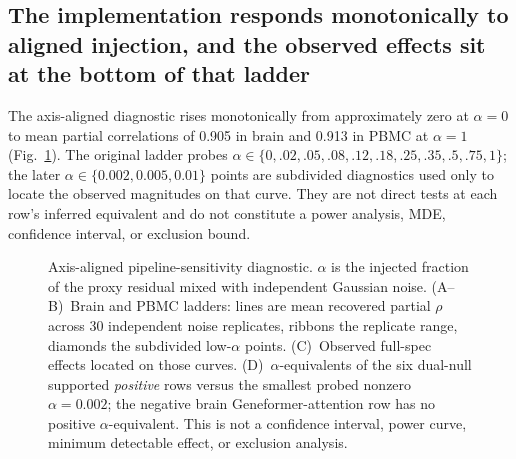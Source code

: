 \documentclass[fleqn,10pt,lineno]{wlpeerj}
\newcommand{\fitfig}[1]{\resizebox{\ifdim\width>\linewidth\linewidth\else\width\fi}{!}{#1}}
\begin{document}
\begin{table}[!tbp]\centering
\fitfig{}
\caption{Per-cell-type descriptive ranges of observed partial $\rho$ under full and non-degree
confound specifications (brain: 15 exploratory FM$\times$type rows; PBMC: 14). Min/max/median
across those rows only; no randomization $p$-values, BH correction, or population-uncertainty
interpretation.}\label{tab:pertype_ranges}
\end{table}

\begin{table}[!tbp]\centering
\fitfig{}
\caption{Non-degree dual-null pattern for all 13 FM rows. The co-primary non-degree specification
is the full design minus the two proxy-derived degree covariates. $M$ is the gene-label
permutation null and $D$ is the within-TF-row degree-preserving target shuffle ($N=999$ each);
each $q$ is BH-adjusted within the non-degree families. Dual-null Support ($q_M<0.05$ and
$q_D<0.05$) is $0/13$. Pattern ``D-only'' is $q_D<0.05$ with $q_M\ge0.05$; ``neither'' is both
$q\ge0.05$. Dual non-deg is reported in the protocol-pass matrix but is not required for
protocol-pass.}\label{tab:nondegree}
\end{table}

\subsection{The implementation responds monotonically to aligned injection, and the observed
effects sit at the bottom of that ladder}
The axis-aligned diagnostic rises monotonically from approximately zero at $\alpha=0$ to mean
partial correlations of 0.905 in brain and 0.913 in PBMC at $\alpha=1$
(Fig.~\ref{fig:sensitivity}). The original ladder probes $\alpha\in\{0,.02,.05,.08,.12,.18,.25,.35,.5,.75,1\}$;
the later $\alpha\in\{0.002,0.005,0.01\}$ points are subdivided diagnostics used only to locate the observed
magnitudes on that curve. They are not direct tests at each row's inferred equivalent and do not
constitute a power analysis, MDE, confidence interval, or exclusion bound.

\begin{figure}[!tbp]\centering
\fitfig{}
\caption{Axis-aligned pipeline-sensitivity diagnostic. $\alpha$ is the injected fraction of the
proxy residual mixed with independent Gaussian noise. (A--B)~Brain and PBMC ladders: lines are
mean recovered partial $\rho$ across 30 independent noise replicates, ribbons the replicate range,
diamonds the subdivided low-$\alpha$ points. (C)~Observed full-spec effects located on those
curves. (D)~$\alpha$-equivalents of the six dual-null supported \emph{positive} rows versus the
smallest probed nonzero $\alpha=0.002$; the negative brain Geneformer-attention row has no
positive $\alpha$-equivalent. This is not a confidence interval, power curve, minimum detectable
effect, or exclusion analysis.}
\label{fig:sensitivity}
\end{figure}
\end{document}
